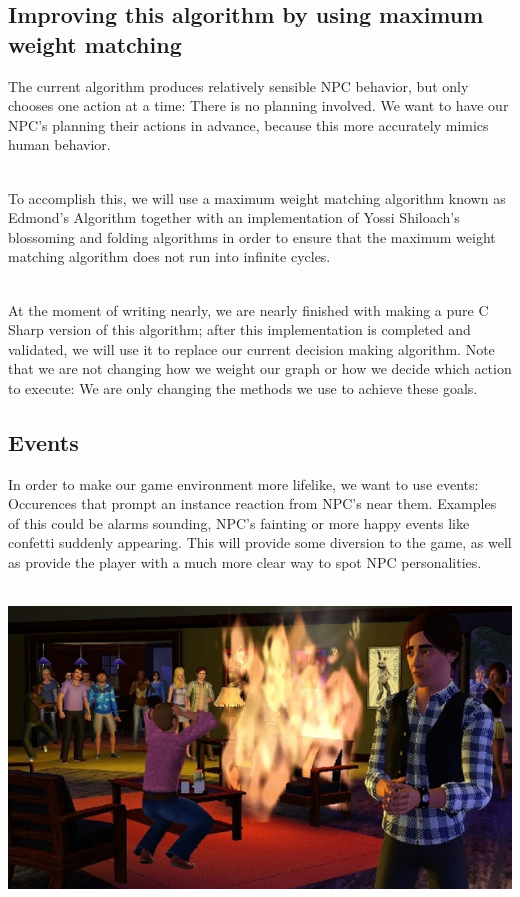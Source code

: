 \documentclass[11pt]{article} %
\begin{document}
\newpage
\subsection{Improving this algorithm by using maximum weight matching}
The current algorithm produces relatively sensible NPC behavior, but only chooses one action at a time: There is no planning involved. We want to have our NPC's planning their actions in advance, because this more accurately mimics human behavior. 

~\\
To accomplish this, we will use a maximum weight matching algorithm known as Edmond's Algorithm together with an implementation of Yossi Shiloach's blossoming and folding algorithms in order to ensure that the maximum weight matching algorithm does not run into infinite cycles. 

~\\
At the moment of writing nearly, we are nearly finished with making a pure C Sharp version of this algorithm; after this implementation is completed and validated, we will use it to replace our current decision making algorithm. Note that we are not changing how we weight our graph or how we decide which action to execute: We are only changing the methods we use to achieve these goals.

\newpage
\subsection{Events}
In order to make our game environment more lifelike, we want to use events: Occurences that prompt an instance reaction from NPC's near them. Examples of this could be alarms sounding, NPC's fainting or more happy events like confetti suddenly appearing. This will provide some diversion to the game, as well as provide the player with a much more clear way to spot NPC personalities.

~\\
\includegraphics[scale=0.7]{SimsFire2}
\end{document}
